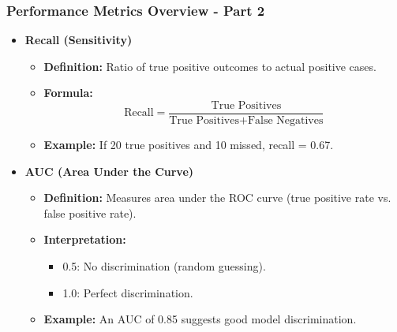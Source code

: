 \documentclass[aspectratio=169]{beamer}
\begin{document}
\begin{frame}[fragile]
    \frametitle{Performance Metrics Overview - Part 2}
    \begin{itemize}
        \item \textbf{Recall (Sensitivity)}
        \begin{itemize}
            \item \textbf{Definition:} Ratio of true positive outcomes to actual positive cases.
            \item \textbf{Formula:} 
            \begin{equation}
            \text{Recall} = \frac{\text{True Positives}}{\text{True Positives} + \text{False Negatives}}
            \end{equation}
            \item \textbf{Example:} If 20 true positives and 10 missed, recall = 0.67.
        \end{itemize}

        \item \textbf{AUC (Area Under the Curve)}
        \begin{itemize}
            \item \textbf{Definition:} Measures area under the ROC curve (true positive rate vs. false positive rate).
            \item \textbf{Interpretation:}
                \begin{itemize}
                    \item 0.5: No discrimination (random guessing).
                    \item 1.0: Perfect discrimination.
                \end{itemize}
            \item \textbf{Example:} An AUC of 0.85 suggests good model discrimination.
        \end{itemize}
    \end{itemize}
\end{frame}
\end{document}
